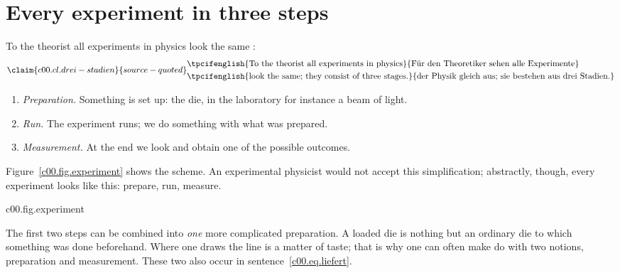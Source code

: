 \section{Every experiment in three steps}\label{c00.s2}

To the theorist all experiments in physics look the same
:
\begin{equation}\label{c00.eq.drei-stadien}\claim{c00.cl.drei-stadien}{source-quoted}
  \begin{aligned}
    &\text{\tpcifenglish{To the theorist all experiments in physics}{Für den Theoretiker sehen alle Experimente}} \\
    &\text{\tpcifenglish{look the same; they consist of three stages.}{der Physik gleich aus; sie bestehen aus drei Stadien.}}
  \end{aligned}
\end{equation}
\begin{enumerate}
  \item \emph{Preparation.} Something is set up: the die, in the laboratory for instance a
    beam of light.
  \item \emph{Run.} The experiment runs; we do something with what was prepared.
  \item \emph{Measurement.} At the end we look and obtain one of the possible outcomes.
\end{enumerate}
Figure~\ref{c00.fig.experiment} shows the scheme. An experimental physicist would not accept
this simplification; abstractly, though, every experiment looks like this: prepare, run,
measure.

\begin{tpcfigure}{c00.fig.experiment}
  \caption{The three stages of an experiment. The brace combines the first two into a single
    preparation. The preparation is drawn solid, the run with a heavier stroke, the
    measurement dashed.}
\end{tpcfigure}

The first two steps can be combined into \emph{one} more complicated preparation. A loaded
die is nothing but an ordinary die to which something was done beforehand. Where one draws
the line is a matter of taste; that is why one can often make do with two notions,
preparation and measurement. These two also occur in sentence~\eqref{c00.eq.liefert}.

